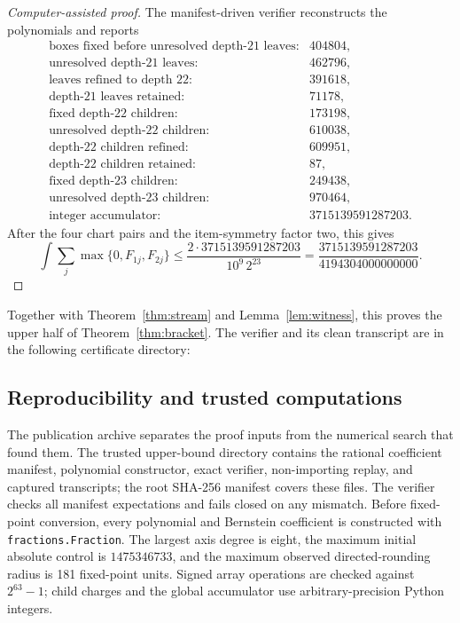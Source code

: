 \documentclass[11pt]{article}
\newcommand{\UpperBound}{\frac{3715139591287203}{4194304000000000}}
\begin{document}
\begin{proof}[Computer-assisted proof]
The manifest-driven verifier reconstructs the polynomials and reports
\[
\begin{array}{rl}
\text{boxes fixed before unresolved depth-21 leaves}:&404804,\\
\text{unresolved depth-21 leaves}:&462796,\\
\text{leaves refined to depth 22}:&391618,\\
\text{depth-21 leaves retained}:&71178,\\
\text{fixed depth-22 children}:&173198,\\
\text{unresolved depth-22 children}:&610038,\\
\text{depth-22 children refined}:&609951,\\
\text{depth-22 children retained}:&87,\\
\text{fixed depth-23 children}:&249438,\\
\text{unresolved depth-23 children}:&970464,\\
\text{integer accumulator}:&3715139591287203.
\end{array}
\]
After the four chart pairs and the item-symmetry factor two, this gives
\[
\int\sum_j\max\{0,F_{1j},F_{2j}\}
\leq
\frac{2\cdot3715139591287203}{10^9\,2^{23}}
=\boxed{\UpperBound}.
\]
\end{proof}
Together with Theorem~\ref{thm:stream} and Lemma~\ref{lem:witness}, this proves
the upper half of Theorem~\ref{thm:bracket}.  The verifier and its
clean transcript are in the following certificate directory:
\begin{center}
\end{center}

\subsection{Reproducibility and trusted computations}

The publication archive separates the proof inputs from the numerical search
that found them.  The trusted upper-bound directory contains the rational
coefficient manifest, polynomial constructor, exact verifier, non-importing
replay, and captured transcripts; the root SHA-256 manifest covers these
files.  The verifier checks all manifest expectations and fails closed on any
mismatch.  Before fixed-point conversion, every polynomial and Bernstein
coefficient is constructed with \texttt{fractions.Fraction}.  The largest axis
degree is eight, the maximum initial absolute control is \(1475346733\), and
the maximum observed directed-rounding radius is 181 fixed-point units.
Signed array operations are checked against \(2^{63}-1\); child charges and
the global accumulator use arbitrary-precision Python integers.
\end{document}
